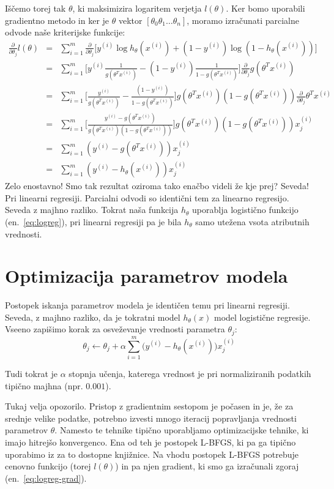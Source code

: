Iščemo torej tak $\theta$, ki maksimizira logaritem verjetja $l(\theta)$. Ker bomo uporabili gradientno metodo in ker je $\theta$ vektor $[\theta_0 \theta_1 \ldots \theta_n]$, moramo izračunati parcialne odvode naše kriterijske funkcije:
\begin{eqnarray}
  \frac{\partial}{\partial\theta_j}l(\theta)
  & = & \sum_{i=1}^m \frac{\partial}{\partial\theta_j} \big[y^{(i)}\log h_\theta(x^{(i)})+(1-y^{(i)})\log (1-h_\theta(x^{(i)})) \big] \nonumber \\
  & = & \sum_{i=1}^m \big[y^{(i)}\frac{1}{g(\theta^T x^{(i)})}-(1-y^{(i)})\frac{1}{1-g(\theta^T x^{(i)})} \big]\frac{\partial}{\partial\theta_j}g(\theta^T x^{(i)}) \nonumber\\
  & = & \sum_{i=1}^m \big[\frac{y^{(i)}}{g(\theta^T x^{(i)})}-\frac{(1-y^{(i)})}{1-g(\theta^T x^{(i)})} \big]g(\theta^T x^{(i)})(1-g(\theta^T x^{(i)}))
  \frac{\partial}{\partial\theta_j}\theta^T x^{(i)}\nonumber\\
  & = & \sum_{i=1}^m \big[\frac{y^{(i)} - g(\theta^T x^{(i)})} {g(\theta^T x^{(i)})(1-g(\theta^T x^{(i)}))} \big]g(\theta^T x^{(i)})(1-g(\theta^T x^{(i)})) x_j^{(i)}\nonumber\\
  & = & \sum_{i=1}^m (y^{(i)}-g(\theta^T x^{(i)}))x_j^{(i)}\nonumber\\
  & = & \sum_{i=1}^m (y^{(i)}-h_\theta(x^{(i)}))x_j^{(i)}\nonumber
  \label{eq:logreg-grad}
\end{eqnarray}
Zelo enostavno! Smo tak rezultat oziroma tako enačbo videli že kje prej? Seveda! Pri linearni regresiji. Parcialni odvodi so identični tem za linearno regresijo. Seveda z majhno razliko. Tokrat naša funkcija $h_\theta$ uporablja logistično funkcijo (en.~\ref{eq:logreg}), pri linearni regresiji pa je bila $h_\theta$ samo utežena vsota atributnih vrednosti.

\section{Optimizacija parametrov modela}

Postopek iskanja parametrov modela je identičen temu pri linearni regresiji. Seveda, z majhno razliko, da je tokratni model $h_\theta(x)$ model logistične regresije. Vseeno zapišimo korak za osveževanje vrednosti parametra $\theta_j$:
\begin{equation}
  \theta_j\leftarrow\theta_j+\alpha\sum_{i=1}^{m}\big(y^{(i)}-h_\theta(x^{(i)})\big) x_j^{(i)}
\end{equation}

Tudi tokrat je $\alpha$ stopnja učenja, katerega vrednost je pri normaliziranih podatkih tipično majhna (npr. $0.001$).

Tukaj velja opozorilo. Pristop z gradientnim sestopom je počasen in je, že za srednje velike podatke, potrebno izvesti mnogo iteracij popravljanja vrednosti parametrov $\theta$. Namesto te tehnike tipično uporabljamo optimizacijske tehnike, ki imajo hitrejšo konvergenco. Ena od teh je postopek L-BFGS, ki pa ga tipično uporabimo iz za to dostopne knjižnice. Na vhodu postopek L-BFGS potrebuje cenovno funkcijo (torej $l(\theta)$) in pa njen gradient, ki smo ga izračunali zgoraj (en.~\ref{eq:logreg-grad}).
